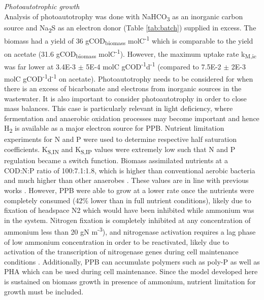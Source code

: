 \skippingparagraph
\textit{Photoautotrophic growth}\\
Analysis of photoautotrophy was done with NaHCO\textsubscript{3} as an inorganic carbon source and Na\textsubscript{2}S as an electron donor (Table \ref{tab:batch}) supplied in excess. The biomass had a yield of 36 gCOD\textsubscript{biomass} molC\textsuperscript{-1} which is comparable to the yield on acetate (31.6 gCOD\textsubscript{biomass} molC\textsuperscript{-1}). However, the maximum uptake rate k\textsubscript{M,ic} was far lower at \num{3.4E-3} $\pm$ \num{5E-4} molC gCOD\textsuperscript{-1}d\textsuperscript{-1} (compared to \num{7.5E-2} $\pm$ \num{2E-3} molC gCOD\textsuperscript{-1}d\textsuperscript{-1} on acetate). Photoautotrophy needs to be considered for when there is an excess of bicarbonate and electrons from inorganic sources in the wastewater. It is also important to consider photoautotrophy in order to close mass balances. This case is particularly relevant in light deficiency, where fermentation and anaerobic oxidation processes may become important and hence H\textsubscript{2} is available as a major electron source for PPB.
\skippingparagraph
Nutrient limitation experiments for N and P were used to determine respective half saturation coefficients. K\textsubscript{S,IN} and K\textsubscript{S,IP} values were extremely low such that N and P regulation became a switch function. Biomass assimilated nutrients at a COD:N:P ratio of 100:7.1:1.8, which is higher than conventional aerobic bacteria and much higher than other anaerobes \cite{tchobanoglous1991}. These values are in line with previous works \cite{hulsen2014}. However, PPB were able to grow at a lower rate once the nutrients were completely consumed (42\% lower than in full nutrient conditions), likely due to fixation of headspace N2 \cite{hunter2008} which would have been inhibited while ammonium was in the system. Nitrogen fixation is completely inhibited at any concentration of ammonium less than 20 gN m\textsuperscript{-3}), and nitrogenase activation requires a lag phase of low ammonium concentration in order to be reactivated, likely due to activation of the transcription of nitrogenase genes during cell maintenance conditions \cite{masepohl2002}. Additionally, PPB can accumulate polymers such as poly-P \cite{liang2010} as well as PHA \cite{melnicki2009} which can be used during cell maintenance. Since the model developed here is sustained on biomass growth in presence of ammonium, nutrient limitation for growth must be included.


